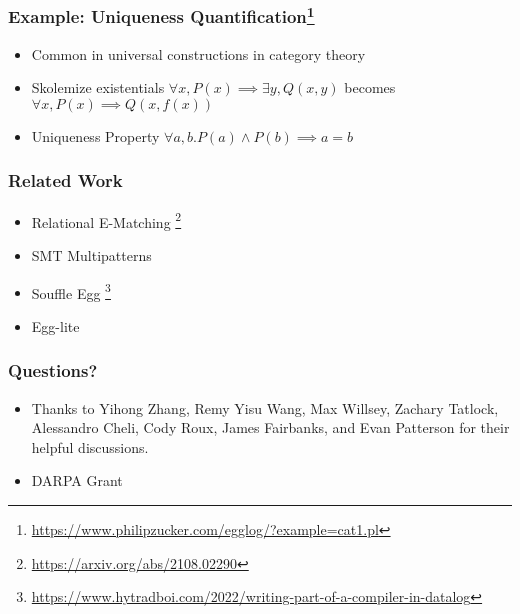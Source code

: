 \documentclass{beamer}
\begin{document}
\begin{frame}[fragile]
    \frametitle{Example: Uniqueness Quantification\footnote{\url{https://www.philipzucker.com/egglog/?example=cat1.pl}}}
    \begin{itemize}
        \item Common in universal constructions in category theory
        \item Skolemize existentials $\forall x, P(x) \implies \exists y, Q(x,y)$  becomes
                $\forall x, P(x) \implies Q(x,f(x))$
        \item Uniqueness Property $\forall a, b. P(a) \land P(b) \implies a = b$
    \end{itemize}
        
\end{frame}

\begin{frame}
    \frametitle{Related Work}
    \begin{itemize} 
        \item Relational E-Matching \footnote{\url{https://arxiv.org/abs/2108.02290}}
        \item SMT Multipatterns
        \item Souffle Egg \footnote{\url{https://www.hytradboi.com/2022/writing-part-of-a-compiler-in-datalog}}
        \item Egg-lite
    \end{itemize}
\end{frame}


\begin{frame}
    \frametitle{Questions?}
    \begin{itemize}
        \item Thanks to Yihong Zhang, Remy Yisu
        Wang, Max Willsey, Zachary Tatlock, Alessandro Cheli, Cody
        Roux, James Fairbanks, and Evan Patterson for their helpful
        discussions.
        \item DARPA Grant 
    \end{itemize}
\end{frame}
\end{document}
